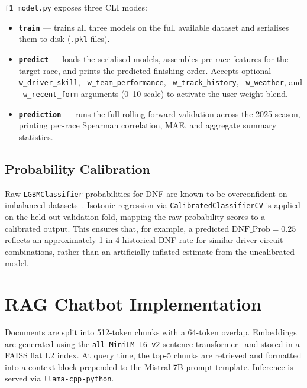 \documentclass[12pt, a4paper, oneside]{report}
\begin{document}
\texttt{f1\_model.py} exposes three CLI modes:

\begin{itemize}[leftmargin=*]
  \item \textbf{\texttt{train}} --- trains all three models on the full
        available dataset and serialises them to disk (\texttt{.pkl} files).
  \item \textbf{\texttt{predict}} --- loads the serialised models, assembles
        pre-race features for the target race, and prints the predicted
        finishing order. Accepts optional \texttt{--w\_driver\_skill},
        \texttt{--w\_team\_performance}, \texttt{--w\_track\_history},
        \texttt{--w\_weather}, and \texttt{--w\_recent\_form} arguments
        (0--10 scale) to activate the user-weight blend.
  \item \textbf{\texttt{prediction}} --- runs the full rolling-forward
        validation across the 2025 season, printing per-race Spearman
        correlation, MAE, and aggregate summary statistics.
\end{itemize}

\subsection{Probability Calibration}
\label{subsec:calibration}

Raw \texttt{LGBMClassifier} probabilities for DNF are known to be overconfident
on imbalanced datasets~\cite{niculescuCalibration2005}. Isotonic regression via
\texttt{CalibratedClassifierCV} is applied on the held-out validation fold,
mapping the raw probability scores to a calibrated output. This ensures that,
for example, a predicted $\text{DNF\_Prob} = 0.25$ reflects an approximately
1-in-4 historical DNF rate for similar driver-circuit combinations, rather than
an artificially inflated estimate from the uncalibrated model.

\section{RAG Chatbot Implementation}

Documents are split into 512-token chunks with a 64-token overlap. Embeddings
are generated using the \texttt{all-MiniLM-L6-v2}
sentence-transformer~\cite{reimersSBERT2019} and stored in a FAISS flat L2
index. At query time, the top-5 chunks are retrieved and formatted into a
context block prepended to the Mistral 7B prompt template. Inference is served
via \texttt{llama-cpp-python}.
\end{document}
